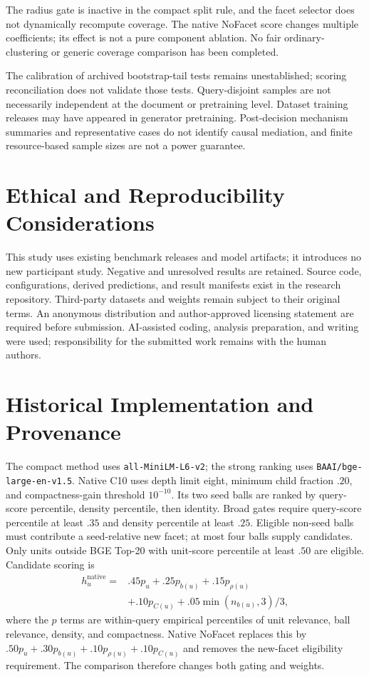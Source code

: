 \documentclass[11pt]{article}
\begin{document}
The radius gate is inactive in the compact split rule, and the
facet selector does not dynamically recompute coverage.
The native NoFacet score changes multiple coefficients; its effect is
not a pure component ablation. No fair ordinary-clustering or generic
coverage comparison has been completed.

The calibration of archived bootstrap-tail tests remains unestablished;
scoring reconciliation does not validate those tests. Query-disjoint samples are not
necessarily independent at the document or pretraining level. Dataset
training releases may have appeared in generator pretraining. Post-decision
mechanism summaries and representative cases do not identify causal
mediation, and finite resource-based sample sizes are not a power guarantee.

\section*{Ethical and Reproducibility Considerations}
This study uses existing benchmark releases and model artifacts; it introduces
no new participant study. Negative and unresolved results are retained.
Source code, configurations, derived predictions, and result manifests exist
in the research repository. Third-party datasets and weights remain subject
to their original terms. An anonymous distribution and author-approved
licensing statement are required before submission. AI-assisted coding,
analysis preparation, and writing were used; responsibility for the submitted
work remains with the human authors.


\appendix
\section{Historical Implementation and Provenance}
\label{app:native}
The compact method uses \texttt{all-MiniLM-L6-v2}; the strong ranking uses
\texttt{BAAI/bge-large-en-v1.5}. Native C10 uses depth limit eight,
minimum child fraction $.20$, and compactness-gain threshold $10^{-10}$.
Its two seed balls are ranked by query-score percentile, density percentile,
then identity. Broad gates require query-score percentile at least $.35$ and
density percentile at least $.25$. Eligible non-seed balls must contribute a
seed-relative new facet; at most four balls supply candidates.
Only units outside BGE Top-20 with unit-score percentile at least $.50$ are
eligible. Candidate scoring is
\begin{equation}
\begin{split}
h_u^{\mathrm{native}}={}&.45p_u+.25p_{b(u)}+.15p_{\rho(u)}\\
&+.10p_{C(u)}+.05\min(n_{b(u)},3)/3 ,
\end{split}
\end{equation}
where the $p$ terms are within-query empirical percentiles of unit relevance,
ball relevance, density, and compactness. Native NoFacet replaces this by
$.50p_u+.30p_{b(u)}+.10p_{\rho(u)}+.10p_{C(u)}$ and removes the new-facet
eligibility requirement. The comparison therefore changes both gating and
weights.
\end{document}
